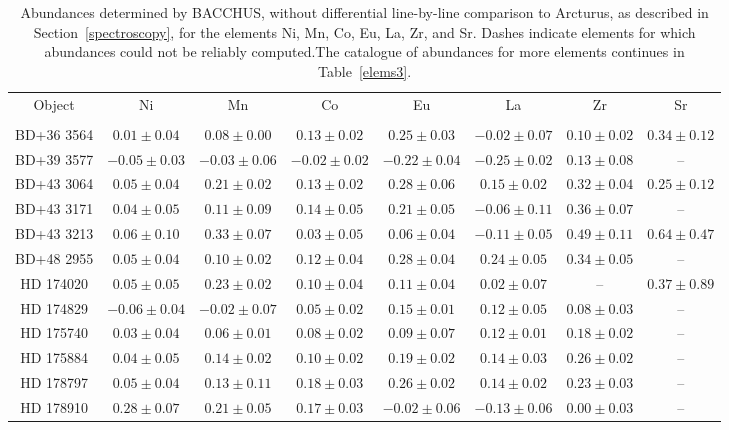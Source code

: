 \begin{table*}
\caption{Abundances determined by BACCHUS, without differential line-by-line comparison to Arcturus, as described in Section~\ref{spectroscopy}, for the elements Ni, Mn, Co, Eu, La, Zr, and Sr. Dashes indicate elements for which abundances could not be reliably computed.The catalogue of abundances for more elements continues in Table~\ref{elems3}.\label{elems2}}
\begin{tabular}{cccccccc}
\hline \hline
Object & Ni & Mn & Co & Eu & La & Zr & Sr \\
 &  &  &  &  &  &  &  \\
\hline
BD+36 3564 & $0.01 \pm 0.04$ & $0.08 \pm 0.00$ & $0.13 \pm 0.02$ & $0.25 \pm 0.03$ & $-0.02 \pm 0.07$ & $0.10 \pm 0.02$ & $0.34 \pm 0.12$ \\
BD+39 3577 & $-0.05 \pm 0.03$ & $-0.03 \pm 0.06$ & $-0.02 \pm 0.02$ & $-0.22 \pm 0.04$ & $-0.25 \pm 0.02$ & $0.13 \pm 0.08$ & -- \\
BD+43 3064 & $0.05 \pm 0.04$ & $0.21 \pm 0.02$ & $0.13 \pm 0.02$ & $0.28 \pm 0.06$ & $0.15 \pm 0.02$ & $0.32 \pm 0.04$ & $0.25 \pm 0.12$ \\
BD+43 3171 & $0.04 \pm 0.05$ & $0.11 \pm 0.09$ & $0.14 \pm 0.05$ & $0.21 \pm 0.05$ & $-0.06 \pm 0.11$ & $0.36 \pm 0.07$ & -- \\
BD+43 3213 & $0.06 \pm 0.10$ & $0.33 \pm 0.07$ & $0.03 \pm 0.05$ & $0.06 \pm 0.04$ & $-0.11 \pm 0.05$ & $0.49 \pm 0.11$ & $0.64 \pm 0.47$ \\
BD+48 2955 & $0.05 \pm 0.04$ & $0.10 \pm 0.02$ & $0.12 \pm 0.04$ & $0.28 \pm 0.04$ & $0.24 \pm 0.05$ & $0.34 \pm 0.05$ & -- \\
HD 174020 & $0.05 \pm 0.05$ & $0.23 \pm 0.02$ & $0.10 \pm 0.04$ & $0.11 \pm 0.04$ & $0.02 \pm 0.07$ & -- & $0.37 \pm 0.89$ \\
HD 174829 & $-0.06 \pm 0.04$ & $-0.02 \pm 0.07$ & $0.05 \pm 0.02$ & $0.15 \pm 0.01$ & $0.12 \pm 0.05$ & $0.08 \pm 0.03$ & -- \\
HD 175740 & $0.03 \pm 0.04$ & $0.06 \pm 0.01$ & $0.08 \pm 0.02$ & $0.09 \pm 0.07$ & $0.12 \pm 0.01$ & $0.18 \pm 0.02$ & -- \\
HD 175884 & $0.04 \pm 0.05$ & $0.14 \pm 0.02$ & $0.10 \pm 0.02$ & $0.19 \pm 0.02$ & $0.14 \pm 0.03$ & $0.26 \pm 0.02$ & -- \\
HD 178797 & $0.05 \pm 0.04$ & $0.13 \pm 0.11$ & $0.18 \pm 0.03$ & $0.26 \pm 0.02$ & $0.14 \pm 0.02$ & $0.23 \pm 0.03$ & -- \\
HD 178910 & $0.28 \pm 0.07$ & $0.21 \pm 0.05$ & $0.17 \pm 0.03$ & $-0.02 \pm 0.06$ & $-0.13 \pm 0.06$ & $0.00 \pm 0.03$ & -- \\

\end{tabular}
\end{table*}
